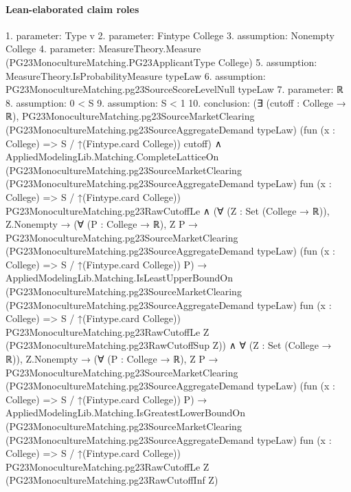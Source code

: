\documentclass[10pt]{article}
\begin{document}
\paragraph{Lean-elaborated claim roles}\begin{ReviewVerbatim}
1. parameter: Type v
2. parameter: Fintype College
3. assumption: Nonempty College
4. parameter: MeasureTheory.Measure (PG23MonocultureMatching.PG23ApplicantType College)
5. assumption: MeasureTheory.IsProbabilityMeasure typeLaw
6. assumption: PG23MonocultureMatching.pg23SourceScoreLevelNull typeLaw
7. parameter: ℝ
8. assumption: 0 < S
9. assumption: S < 1
10. conclusion: (∃ (cutoff : College → ℝ),
    PG23MonocultureMatching.pg23SourceMarketClearing (PG23MonocultureMatching.pg23SourceAggregateDemand typeLaw)
      (fun (x : College) => S / ↑(Fintype.card College)) cutoff) ∧
  AppliedModelingLib.Matching.CompleteLatticeOn
      (PG23MonocultureMatching.pg23SourceMarketClearing (PG23MonocultureMatching.pg23SourceAggregateDemand typeLaw)
        fun (x : College) => S / ↑(Fintype.card College))
      PG23MonocultureMatching.pg23RawCutoffLe ∧
    (∀ (Z : Set (College → ℝ)),
        Z.Nonempty →
          (∀ (P : College → ℝ),
              Z P →
                PG23MonocultureMatching.pg23SourceMarketClearing
                  (PG23MonocultureMatching.pg23SourceAggregateDemand typeLaw)
                  (fun (x : College) => S / ↑(Fintype.card College)) P) →
            AppliedModelingLib.Matching.IsLeastUpperBoundOn
              (PG23MonocultureMatching.pg23SourceMarketClearing
                (PG23MonocultureMatching.pg23SourceAggregateDemand typeLaw) fun (x : College) =>
                S / ↑(Fintype.card College))
              PG23MonocultureMatching.pg23RawCutoffLe Z (PG23MonocultureMatching.pg23RawCutoffSup Z)) ∧
      ∀ (Z : Set (College → ℝ)),
        Z.Nonempty →
          (∀ (P : College → ℝ),
              Z P →
                PG23MonocultureMatching.pg23SourceMarketClearing
                  (PG23MonocultureMatching.pg23SourceAggregateDemand typeLaw)
                  (fun (x : College) => S / ↑(Fintype.card College)) P) →
            AppliedModelingLib.Matching.IsGreatestLowerBoundOn
              (PG23MonocultureMatching.pg23SourceMarketClearing
                (PG23MonocultureMatching.pg23SourceAggregateDemand typeLaw) fun (x : College) =>
                S / ↑(Fintype.card College))
              PG23MonocultureMatching.pg23RawCutoffLe Z (PG23MonocultureMatching.pg23RawCutoffInf Z)
\end{ReviewVerbatim}
\end{document}
